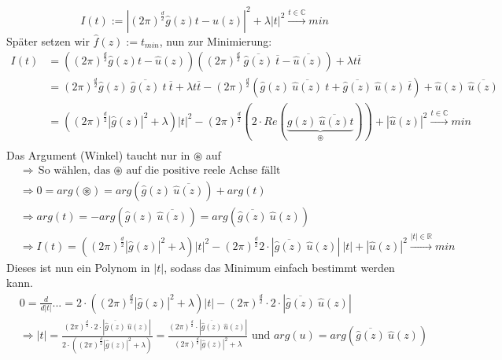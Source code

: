 \documentclass{article}
\theoremstyle{plain}
\theoremstyle{definition}
\numberwithin{equation}{section}
\newcommand{\R}[0] {
\mathbb R
}
\newcommand{\C}[0]{
    \cdot
}
\begin{document}
\begin{enumerate}[label = \arabic*. Ansatz:]
                    \[I(t):=|(2 \pi)^\frac{d}{2} \hat g(z)t - \hat u(z)|^2 + \lambda |t|^2 \overset{t \in \mathbb C}{\longrightarrow}min\]
                    Später setzen wir $\hat f(z):=t_{min}$, nun zur Minimierung:
                    \begin{align*}
                        I(t)&=((2 \pi)^\frac{d}{2} \hat g(z) t - \hat u(z))((2 \pi)^\frac{d}{2} \ \overline{\hat g(z)} \ \overline t -\overline{\hat u (z)}) + \lambda t \overline t\\
                        &=(2 \pi)^\frac{d}{2} \hat g(z) \ \overline{\hat g(z)} \ t \ \overline t + \lambda t \overline t - (2 \pi)^\frac{d}{2} (\hat g(z) \ \overline{\hat u(z)} \ t + \overline{\hat g(z)} \ \hat u(z) \ \overline{t}) + \hat u(z) \ \overline{\hat u(z)}\\
                        &=((2 \pi)^\frac{d}{2} |\hat g(z)|^2 + \lambda)|t|^2 - (2 \pi)^\frac{d}{2} (2 \C Re(\underbrace{\hat g(z) \ \overline{\hat u(z)}t}_{\circledast})) + |\hat u(z)|^2 \overset{t \in \mathbb C}{\longrightarrow} min\\
                    \end{align*}
                    Das Argument (Winkel) taucht nur in $\circledast$ auf\\
                    \begin{align*}
                        &\Rightarrow \text{So wählen, das $\circledast$ auf die positive reele Achse fällt}\\
                        &\Rightarrow 0=arg(\circledast)= arg(\hat g(z) \ \overline{\hat u(z)}) + arg(t)\\
                        &\Rightarrow arg(t)=-arg(\hat g(z) \ \overline{\hat u(z)})=arg(\overline{\hat g(z)} \ \hat u(z))\\
                        &\Rightarrow I(t) = ((2\pi)^\frac{d}{2} |\hat g(z)|^2 + \lambda)|t|^2 - (2\pi)^\frac{d}{2} 2 \C |\overline{\hat g(z)} \ \hat u(z)| \ |t| + |\hat u (z)|^2 \overset{|t| \in \R}{\longrightarrow}min
                    \end{align*}
                    Dieses ist nun ein Polynom in $|t|$, sodass das Minimum einfach bestimmt werden kann.\\
                    \begin{align*}
                        &0=\frac{d}{d|t|}...=2\C((2\pi)^\frac{d}{2}|\hat g(z)|^2 + \lambda)|t| - (2\pi)^\frac{d}{2} \C 2 \C |\overline{\hat g(z)} \ \hat u(z)|\\
                        &\Rightarrow |t| = \frac{(2\pi)^\frac{d}{2} \C 2 \C |\overline{\hat g(z)} \ \hat u(z)|}{2\C((2\pi)^\frac{d}{2}|\hat g(z)|^2 + \lambda)} = \frac{(2\pi)^\frac{d}{2}\C |\overline{\hat g(z)} \ \hat u(z)|}{(2\pi)^\frac{d}{2}|\hat g(z)|^2 + \lambda} \text{ und } arg(u)=arg(\overline{\hat g(z)} \ \hat u(z))\\

\end{align*}
\end{enumerate}
\end{document}
